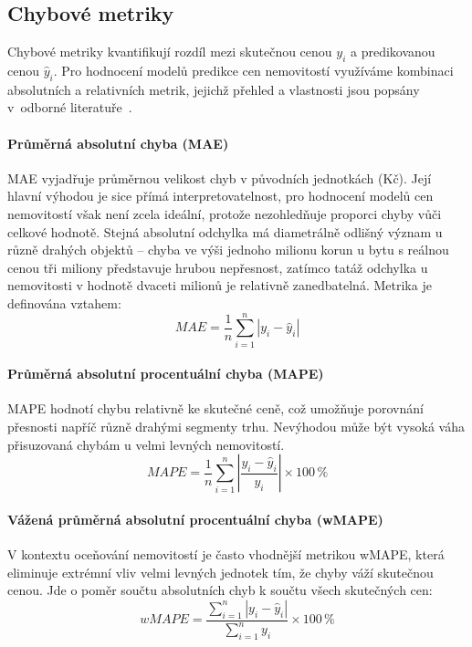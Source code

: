 \subsection*{Chybové metriky}
\label{subsec:error_metrics_theory}

Chybové metriky kvantifikují rozdíl mezi skutečnou cenou $y_i$ a predikovanou cenou $\hat{y}_i$. Pro hodnocení modelů predikce cen nemovitostí využíváme kombinaci absolutních a relativních metrik, jejichž přehled a vlastnosti jsou popsány v~odborné literatuře~\cite{Hyndman2006ForecastAccuracy}.

\paragraph{Průměrná absolutní chyba (MAE)}
MAE vyjadřuje průměrnou velikost chyb v původních jednotkách (Kč). Její hlavní výhodou je sice přímá interpretovatelnost, pro hodnocení modelů cen nemovitostí však není zcela ideální, protože nezohledňuje proporci chyby vůči celkové hodnotě. Stejná absolutní odchylka má diametrálně odlišný význam u různě drahých objektů – chyba ve výši jednoho milionu korun u bytu s reálnou cenou tři miliony představuje hrubou nepřesnost, zatímco tatáž odchylka u nemovitosti v hodnotě dvaceti milionů je relativně zanedbatelná. Metrika je definována vztahem:
\begin{equation}
    MAE = \frac{1}{n} \sum_{i=1}^{n} |y_i - \hat{y}_i|
\end{equation}

\paragraph{Průměrná absolutní procentuální chyba (MAPE)}
MAPE hodnotí chybu relativně ke skutečné ceně, což umožňuje porovnání přesnosti napříč různě drahými segmenty trhu. Nevýhodou může být vysoká váha přisuzovaná chybám u velmi levných nemovitostí.
\begin{equation}
    MAPE = \frac{1}{n} \sum_{i=1}^{n} \left| \frac{y_i - \hat{y}_i}{y_i} \right| \times 100\,\%
\end{equation}

\paragraph{Vážená průměrná absolutní procentuální chyba (wMAPE)}
V kontextu oceňování nemovitostí je často vhodnější metrikou wMAPE, která eliminuje extrémní vliv velmi levných jednotek tím, že chyby váží skutečnou cenou. Jde o poměr součtu absolutních chyb k součtu všech skutečných cen:
\begin{equation}
    wMAPE = \frac{\sum_{i=1}^{n} |y_i - \hat{y}_i|}{\sum_{i=1}^{n} y_i} \times 100\,\%
\end{equation}

